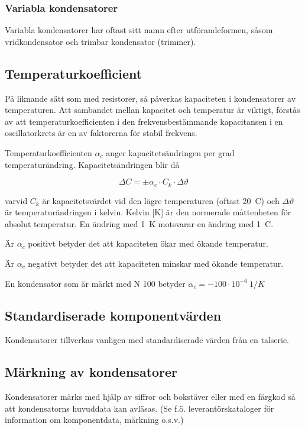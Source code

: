 \subsubsection{Variabla kondensatorer}
Variabla kondensatorer har oftast sitt namn efter utförandeformen, såsom
vridkondensator och trimbar kondensator (trimmer).

\subsection{Temperaturkoefficient}

På liknande sätt som med resistorer, så påverkas kapaciteten i kondensatorer av
temperaturen. Att sambandet mellan kapacitet och temperatur är viktigt, förstås
av att temperaturkoefficienten i den frekvensbestämmande kapacitansen i en
oscillatorkrets är en av faktorerna för stabil frekvens.

Temperaturkoefficienten \(\alpha _c\) anger kapacitetsändringen per grad temperaturändring.
Kapacitetsändringen blir då

\[\Delta C = \pm \alpha _c \cdot C_k \cdot \Delta\vartheta\]

varvid \(C_k\) är kapacitetsvärdet vid den lägre temperaturen (oftast 20~\degree C) och
\(\Delta\vartheta\) är temperaturändringen i kelvin.
Kelvin [K] är den normerade måttenheten för absolut temperatur.
En ändring med 1~K motsvarar en ändring med 1~\degree C.

Är \(\alpha _c\) positivt betyder det att kapaciteten ökar med ökande
temperatur.

Är \(\alpha _c\) negativt betyder det att kapaciteten minskar med ökande
temperatur.

En kondensator som är märkt med N 100 betyder
\(\alpha _c = -100 \cdot 10^{-6}\ 1/K\)

\subsection{Standardiserade komponentvärden}

Kondensatorer tillverkas vanligen med standardiserade värden från en talserie.

\subsection{Märkning av kondensatorer}

Kondensatorer märks med hjälp av siffror och bokstäver eller med en färgkod så att
kondensatorns huvuddata kan avläsas.
(Se f.ö. leverantörskataloger för information om komponentdata, märkning o.s.v.)
